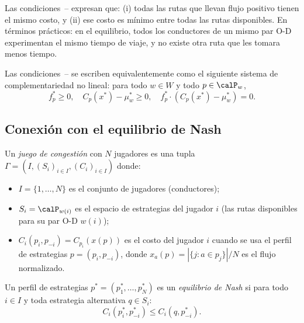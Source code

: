 \begin{remark}
Las condiciones~-- expresan que: (i) todas las rutas que llevan flujo positivo tienen el mismo costo, y (ii) ese costo es mínimo entre todas las rutas disponibles. En términos prácticos: en el equilibrio, todos los conductores de un mismo par O-D experimentan el mismo tiempo de viaje, y no existe otra ruta que les tomara menos tiempo.
\end{remark}

\begin{definition}
Las condiciones~-- se escriben equivalentemente como el siguiente sistema de complementariedad no lineal: para todo $w \in W$ y todo $p \in \calP_w$,
\begin{equation}\label{eq:complementarity}
f_p^* \geq 0, \quad C_p(x^*) - \mu_w^* \geq 0, \quad f_p^* \cdot \left( C_p(x^*) - \mu_w^* \right) = 0.
\end{equation}
\end{definition}

\subsection{Conexión con el equilibrio de Nash}

\begin{definition}
Un \emph{juego de congestión} con $N$ jugadores es una tupla $\Gamma = (I, (S_i)_{i \in I}, (C_i)_{i \in I})$ donde:
\begin{itemize}
    \item $I = \{1, \ldots, N\}$ es el conjunto de jugadores (conductores);
    \item $S_i = \calP_{w(i)}$ es el espacio de estrategias del jugador $i$ (las rutas disponibles para su par O-D $w(i)$);
    \item $C_i(p_i, p_{-i}) = C_{p_i}(x(p))$ es el costo del jugador $i$ cuando se usa el perfil de estrategias $p = (p_i, p_{-i})$, donde $x_a(p) = |\{j : a \in p_j\}|/N$ es el flujo normalizado.
\end{itemize}
\end{definition}

\begin{definition}
Un perfil de estrategias $p^* = (p_1^*, \ldots, p_N^*)$ es un \emph{equilibrio de Nash} si para todo $i \in I$ y toda estrategia alternativa $q \in S_i$:
\[
C_i(p_i^*, p_{-i}^*) \leq C_i(q, p_{-i}^*).
\]
\end{definition}

